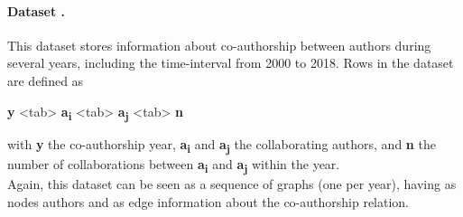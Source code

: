 \paragraph{\textbf{Dataset \DStwo}.}
This dataset stores information about co-authorship between  authors during several years, including the time-interval from 2000 to 2018.  Rows in the dataset are defined as  
\begin{center}
\newcommand{\TAB}{\textless tab\textgreater}
\textbf{y} \TAB{} \textbf{a\textsubscript i} \TAB{} \textbf{a\textsubscript j} \TAB{} \textbf{n}
\end{center}
with \textbf{y} the co-authorship year, \textbf{a\textsubscript{i}} and \textbf{a\textsubscript{j}} the collaborating authors, and \textbf{n} the number of  collaborations between   \textbf{a\textsubscript{i}} and \textbf{a\textsubscript{j}} within the year.\\
Again, this dataset can be seen as a sequence of graphs (one per year), having as nodes authors and as edge information about the co-authorship relation.
 